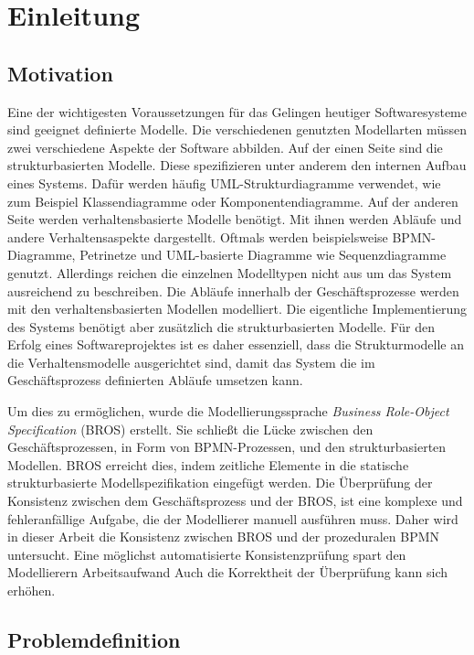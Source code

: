 \chapter{Einleitung}
\label{chap:introduction}

\section{Motivation}

Eine der wichtigesten Voraussetzungen für das Gelingen heutiger Softwaresysteme sind geeignet definierte Modelle.
Die verschiedenen genutzten Modellarten müssen zwei verschiedene Aspekte der Software abbilden.
Auf der einen Seite sind die strukturbasierten Modelle.
Diese spezifizieren unter anderem den internen Aufbau eines Systems.
Dafür werden häufig UML-Strukturdiagramme verwendet, wie zum Beispiel Klassendiagramme oder Komponentendiagramme.
Auf der anderen Seite werden verhaltensbasierte Modelle benötigt.
Mit ihnen werden Abläufe und andere Verhaltensaspekte dargestellt.
Oftmals werden beispielsweise BPMN-Diagramme, Petrinetze und UML-basierte Diagramme wie Sequenzdiagramme genutzt.
Allerdings reichen die einzelnen Modelltypen nicht aus um das System ausreichend zu beschreiben.
Die Abläufe innerhalb der Geschäftsprozesse werden mit den verhaltensbasierten Modellen modelliert.
Die eigentliche Implementierung des Systems benötigt aber zusätzlich die strukturbasierten Modelle.
Für den Erfolg eines Softwareprojektes ist es daher essenziell, dass die Strukturmodelle an die Verhaltensmodelle ausgerichtet sind, damit das System die im Geschäftsprozess definierten Abläufe umsetzen kann.

Um dies zu ermöglichen, wurde die Modellierungssprache \emph{Business Role-Object Specification} (BROS) erstellt.
Sie schließt die Lücke zwischen den Geschäftsprozessen, in Form von BPMN-Prozessen, und den  strukturbasierten Modellen.
BROS erreicht dies, indem zeitliche Elemente in die statische strukturbasierte Modellspezifikation eingefügt werden.
Die Überprüfung der Konsistenz zwischen dem Geschäftsprozess und der BROS, ist eine komplexe und fehleranfällige Aufgabe, die der Modellierer manuell ausführen muss.
Daher wird in dieser Arbeit die Konsistenz zwischen BROS und der prozeduralen BPMN untersucht.
Eine möglichst automatisierte Konsistenzprüfung spart den Modellierern Arbeitsaufwand
Auch die Korrektheit der Überprüfung kann sich erhöhen.

\section{Problemdefinition}

